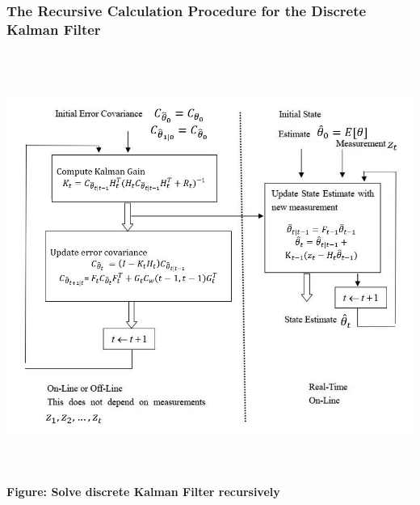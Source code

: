 \documentclass[a4 paper]{article}
\begin{document}
\subsubsection{The Recursive Calculation Procedure for the Discrete Kalman Filter}
\begin{center}
    \includegraphics[height=14cm]{figure/recursive_new.JPG}\\
    \textbf{Figure: Solve discrete Kalman Filter recursively}
\end{center}
\newpage
\end{document}

